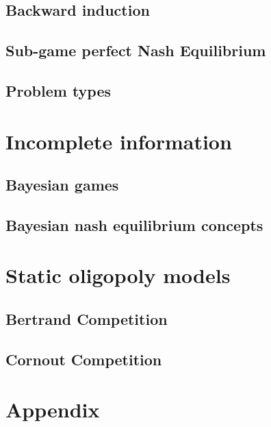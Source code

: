 \documentclass{article}
\begin{document}
\subsection{Backward induction}

\subsection{Sub-game perfect Nash Equilibrium}

\subsection{Problem types}


\section{Incomplete information}\label{II}

\subsection{Bayesian games}\label{bayes}

\subsection{Bayesian nash equilibrium concepts}\label{WPBNE}



\section{Static oligopoly models}\label{SO}

\subsection{Bertrand Competition}

\subsection{Cornout Competition}


\section{Appendix}
\end{document}
